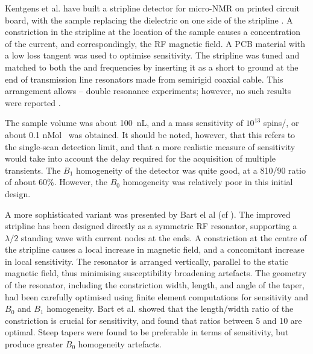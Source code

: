 Kentgens et al. have built a stripline detector for
micro-NMR on printed circuit board, with the sample replacing the
dielectric on one side of the stripline \cite{vanBentum:2007fd}. A
constriction in the stripline at the location of the sample causes a
concentration of the current, and correspondingly, the RF magnetic
field. A PCB material with a low loss tangent was used to optimise
sensitivity. The stripline was tuned and matched to both the  and 
 frequencies by inserting it as a short to ground at the end of
transmission line resonators made from semirigid coaxial cable. This
arrangement allows --  double resonance experiments;
however, no such results were reported \cite{vanBentum:2007fd}. 

The sample volume was about
100~nL, and a mass sensitivity of $10^{13}$ spins/, or about 0.1
nMol~ was obtained. It should be noted, however, that this refers
to the single-scan detection limit, and that a more realistic measure of
sensitivity would take into account the delay required for the
acquisition of multiple transients. The $B_1$ homogeneity of the detector
was quite good, at a 810/90 ratio of about 60\%. However, the $B_0$
homogeneity was relatively poor in this initial design. 

A more sophisticated variant was presented by Bart el al
\cite{Bart:2009kc} (cf ). The improved stripline has been designed directly as a
symmetric RF resonator, supporting a $\lambda/2$ standing wave with
current nodes at the ends. A constriction
at the centre of the stripline causes a local increase in magnetic field, and a
concomitant increase in local sensitivity. The resonator is arranged
vertically, parallel to the static magnetic field, thus minimising
susceptibility broadening artefacts. The geometry of the resonator,
including the constriction width, length, and angle of the taper, had
been carefully optimised using finite element computations
\cite{Bart:2009er} for sensitivity and $B_0$ and $B_1$ homogeneity. Bart et al.
showed that the length/width ratio of the constriction is crucial for
sensitivity, and found that ratios between 5 and 10 are optimal. Steep
tapers were found to be preferable in terms of sensitivity, but produce
greater $B_0$ homogeneity artefacts. 

